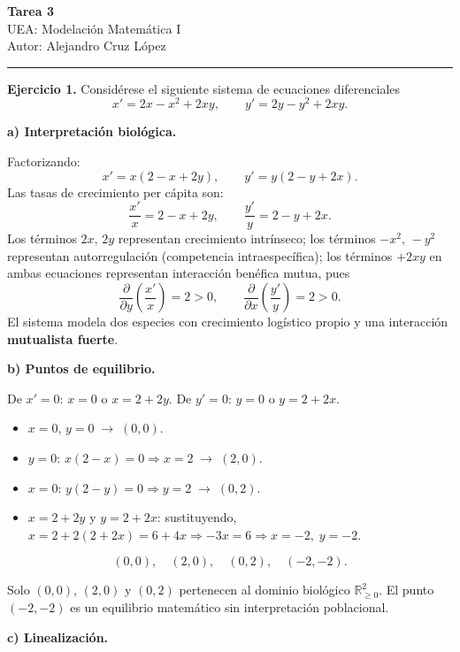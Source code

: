 \documentclass[12pt,letterpaper]{article}
\begin{document}
\begin{center}
  {\LARGE\bfseries Tarea 3}\\[6pt]
  {\large UEA: Modelación Matemática I}\\[4pt]
  {\large Autor: Alejandro Cruz López}
\end{center}

\bigskip
\noindent\rule{\textwidth}{0.5pt}
\bigskip

\noindent\textbf{Ejercicio 1.} Considérese el siguiente sistema de ecuaciones diferenciales
\[
  x' = 2x - x^2 + 2xy, \qquad y' = 2y - y^2 + 2xy.
\]

\noindent\textbf{a) Interpretación biológica.}

Factorizando:
\[
  x' = x(2 - x + 2y), \qquad y' = y(2 - y + 2x).
\]
Las tasas de crecimiento per cápita son:
\[
  \frac{x'}{x} = 2 - x + 2y, \qquad \frac{y'}{y} = 2 - y + 2x.
\]
Los términos $2x,\,2y$ representan crecimiento intrínseco; los términos $-x^2,\,-y^2$
representan autorregulación (competencia intraespecífica); los términos $+2xy$ en ambas
ecuaciones representan interacción benéfica mutua, pues
\[
  \frac{\partial}{\partial y}\!\left(\frac{x'}{x}\right) = 2 > 0,
  \qquad
  \frac{\partial}{\partial x}\!\left(\frac{y'}{y}\right) = 2 > 0.
\]
El sistema modela dos especies con crecimiento logístico propio y una interacción \textbf{mutualista fuerte}.

\bigskip
\noindent\textbf{b) Puntos de equilibrio.}

De $x'=0$: $x=0$ o $x = 2+2y$.
De $y'=0$: $y=0$ o $y = 2+2x$.

\begin{itemize}
  \item $x=0,\,y=0 \;\to\; (0,0)$.
  \item $y=0$: $x(2-x)=0 \Rightarrow x=2 \;\to\; (2,0)$.
  \item $x=0$: $y(2-y)=0 \Rightarrow y=2 \;\to\; (0,2)$.
  \item $x=2+2y$ y $y=2+2x$: sustituyendo, $x = 2+2(2+2x) = 6+4x \Rightarrow -3x=6
    \Rightarrow x=-2,\; y=-2$.
\end{itemize}

\[
  \boxed{(0,0),\quad (2,0),\quad (0,2),\quad (-2,-2).}
\]

Solo $(0,0)$, $(2,0)$ y $(0,2)$ pertenecen al dominio biológico $\mathbb{R}_{\geq 0}^2$.
El punto $(-2,-2)$ es un equilibrio matemático sin interpretación poblacional.

\bigskip
\noindent\textbf{c) Linealización.}
\end{document}

